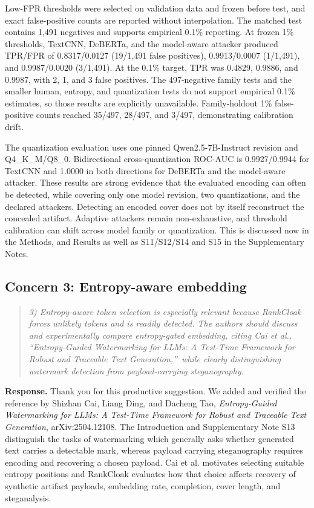 \documentclass[11pt]{article}
\newenvironment{reviewcomment}{\begin{quote}\color{commentgray}\itshape}{\end{quote}}
\begin{document}
Low-FPR thresholds were selected on validation data and frozen before test, and exact false-positive counts are reported without interpolation. The matched test contains 1,491 negatives and supports empirical 0.1\% reporting. At frozen 1\% thresholds, TextCNN, DeBERTa, and the model-aware attacker produced TPR/FPR of 0.8317/0.0127 (19/1,491 false positives), 0.9913/0.0007 (1/1,491), and 0.9987/0.0020 (3/1,491). At the 0.1\% target, TPR was 0.4829, 0.9886, and 0.9987, with 2, 1, and 3 false positives. The 497-negative family tests and the smaller human, entropy, and quantization tests do not support empirical 0.1\% estimates, so those results are explicitly unavailable. Family-holdout 1\% false-positive counts reached 35/497, 28/497, and 3/497, demonstrating calibration drift.

The quantization evaluation uses one pinned Qwen2.5-7B-Instruct revision and Q4\_K\_M/Q8\_0. Bidirectional cross-quantization ROC-AUC is 0.9927/0.9944 for TextCNN and 1.0000 in both directions for DeBERTa and the model-aware attacker. These results are strong evidence that the evaluated encoding can often be detected, while covering only one model revision, two quantizations, and the declared attackers. Detecting an encoded cover does not by itself reconstruct the concealed artifact. Adaptive attackers remain non-exhaustive, and threshold calibration can shift across model family or quantization.
This is discussed now in the Methods, and Results as well as S11/S12/S14 and S15 in the Supplementary Notes.


\subsection*{Concern 3: Entropy-aware embedding}

\begin{reviewcomment}
3) Entropy-aware token selection is especially relevant because RankCloak forces unlikely tokens and is readily detected. The authors should discuss and experimentally compare entropy-gated embedding, citing Cai et al., \textquotedblleft Entropy-Guided Watermarking for LLMs: A Test-Time Framework for Robust and Traceable Text Generation,\textquotedblright\ while clearly distinguishing watermark detection from payload-carrying steganography.
\end{reviewcomment}


\noindent\textbf{Response.}
Thank you for this productive suggestion. We added and verified the reference by Shizhan Cai, Liang Ding, and Dacheng Tao, \emph{Entropy-Guided Watermarking for LLMs: A Test-Time Framework for Robust and Traceable Text Generation}, arXiv:2504.12108. The Introduction and Supplementary Note S13 distinguish the tasks of watermarking which generally asks whether generated text carries a detectable mark, whereas payload carrying steganography requires encoding and recovering a chosen payload. Cai et al. motivates selecting suitable entropy positions and RankCloak evaluates how that choice affects recovery of synthetic artifact payloads, embedding rate, completion, cover length, and steganalysis.
\end{document}
